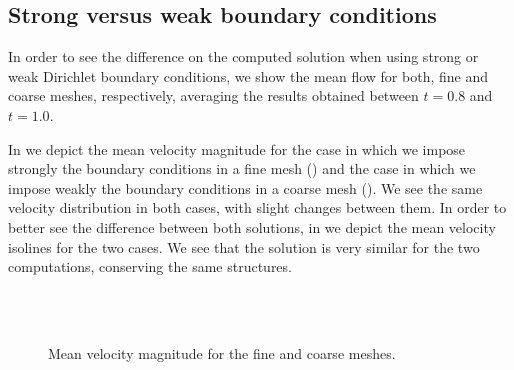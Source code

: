 \subsection{Strong versus weak boundary conditions}
In order to see the difference on the computed solution when using strong or weak Dirichlet boundary conditions, we show the mean flow for both, fine and coarse meshes, respectively, averaging the results obtained between $ t=0.8 $ and $ t=1.0 $.

In  we depict the mean velocity magnitude for the case in which we impose strongly the boundary conditions in a fine mesh () and the case in which we impose weakly the boundary conditions in a coarse mesh (). We see the same velocity distribution in both cases, with slight changes between them. In order to better see the difference between both solutions, in  we depict the mean velocity isolines for the two cases. We see that the solution is very similar for the two computations, conserving the same structures. 
\begin{figure}[h!]
  \centering
  \\
  \\
  \caption{Mean velocity magnitude for the fine and coarse meshes.}
  \label{fig-NACA_mean_velo}
\end{figure}
